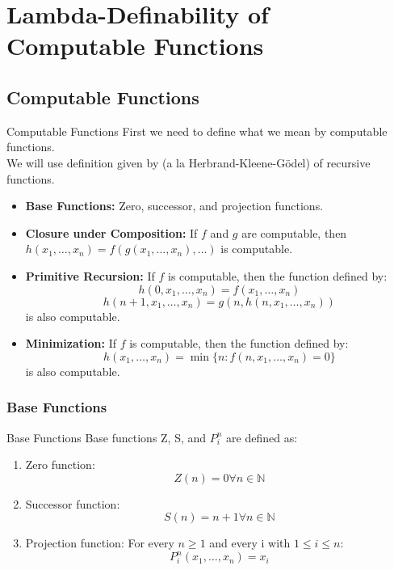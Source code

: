 \documentclass{beamer}
\begin{document}
\section{Lambda-Definability of Computable Functions}

\subsection{Computable Functions}
\begin{frame}{Computable Functions}
  First we need to define what we mean by computable functions.\\
  We will use definition given by (a la Herbrand-Kleene-Gödel) of recursive functions.

  \begin{itemize}
    \item \textbf{Base Functions:} Zero, successor, and projection functions.
    \item \textbf{Closure under Composition:} If \(f\) and \(g\) are computable, then \(h(x_1,\dots,x_n) = f(g(x_1,\dots,x_n),\dots)\) is computable.
    \item \textbf{Primitive Recursion:} If \(f\) is computable, then the function defined by:
      \[
      h(0,x_1,\dots,x_n) = f(x_1,\dots,x_n)
      \]
      \[
      h(n+1,x_1,\dots,x_n) = g(n,h(n,x_1,\dots,x_n))
      \]
      is also computable.
    \item \textbf{Minimization:} If \(f\) is computable, then the function defined by:
      \[
      h(x_1,\dots,x_n) = \min\{n : f(n,x_1,\dots,x_n) = 0\}
      \]
      is also computable.
  \end{itemize}
\end{frame}

\begin{frame}
  \frametitle{Base Functions}
  \begin{block}{Base Functions}
    Base functions Z, S, and \(P_i^n\) are defined as:
    \begin{enumerate}
      \item Zero function:
        \[
          Z(n) = 0 \forall n \in \mathbb{N}
        \]
      \item Successor function:
        \[
          S(n) = n + 1 \forall n \in \mathbb{N}
        \]
      \item Projection function: For every \(n\geq1\) and every i with \(1\leq i \leq n\):
        \[
          P_i^n(x_1,\dots,x_n) = x_i
        \]
    \end{enumerate}
    
  \end{block}
\end{frame}
\end{document}
